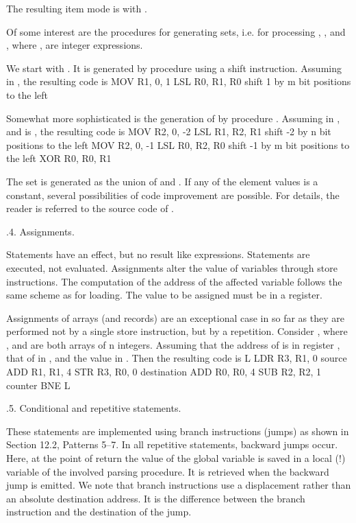 \noindent The resulting item mode is  with .

Of some interest are the procedures for generating sets, i.e. for processing , , and , where ,  are integer expressions.

We start with . It is generated by procedure  using a shift instruction. Assuming  in , the resulting code is
\begintt
MOV R1, 0, 1
LSL R0, R1, R0 shift 1 by m bit positions to the left
\endtt

\noindent Somewhat more sophisticated is the generation of  by procedure . Assuming  in , and  is , the resulting code is
\begintt
MOV R2, 0, -2
LSL R1, R2, R1 shift -2 by n bit positions to the left
MOV R2, 0, -1
LSL R0, R2, R0 shift -1 by m bit positions to the left
XOR R0, R0, R1
\endtt

\noindent The set  is generated as the union of  and . If any of the element values is a constant, several possibilities of code improvement are possible. For details, the reader is referred to the source code of .

.4. Assignments.

Statements have an effect, but no result like expressions. Statements are executed, not evaluated. Assignments alter the value of variables through store instructions. The computation of the address of the affected variable follows the same scheme as for loading. The value to be assigned must be in a register.

Assignments of arrays (and records) are an exceptional case in so far as they are performed not by a single store instruction, but by a repetition. Consider , where , and  are both arrays of n integers. Assuming that the address of  is in register , that of  in , and the value  in . Then the resulting code is
\begintt
L  LDR R3, R1, 0 source
   ADD R1, R1, 4
   STR R3, R0, 0 destination
   ADD R0, R0, 4
   SUB R2, R2, 1 counter
   BNE L
\endtt

.5. Conditional and repetitive statements.

These statements are implemented using branch instructions (jumps) as shown in Section 12.2, Patterns 5--7. In all repetitive statements, backward jumps occur. Here, at the point of return the value of the global variable  is saved in a local (!) variable of the involved parsing procedure. It is retrieved when the backward jump is emitted. We note that branch instructions use a displacement rather than an absolute destination address. It is the difference between the branch instruction and the destination of the jump.

